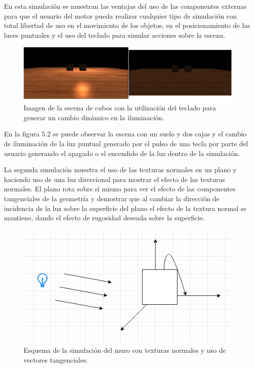 \documentclass[a4paper, 17pt]{book}
\begin{document}
En esta simulación se muestran las ventajas del uso de las componentes externas para que el usuario del motor pueda realizar
cualquier tipo de simulación con total libertad de uso en el movimiento de los objetos, en el posicionamiento de las luces
puntuales y el uso del teclado para simular acciones sobre la escena.

\begin{figure}[H]
    \centering
    \includegraphics[scale=0.45, keepaspectratio]{img/CubeEvents.png}
    \caption{Imagen de la escena de cubos con la utilización del teclado para generar un cambio dinámico en la iluminación.}
    \label{figura:CubeEvents}
\end{figure}

En la figura 5.2 se puede observar la escena con un suelo y dos cajas y el cambio de iluminación de la luz puntual generado por
el pulso de una tecla por parte del usuario generando el apagado o el encendido de la luz dentro de la simulación.

\vspace{1mm} %

La segunda simulación muestra el uso de las texturas normales en un plano y haciendo uso de una luz direccional para mostrar
el efecto de las texturas normales. El plano rota sobre sí mismo para ver el efecto de las componentes tangenciales de la
geometría y demostrar que al cambiar la dirección de incidencia de la luz sobre la superficie del plano el efecto de la textura
normal se mantiene, dando el efecto de rugosidad deseada sobre la superficie.

\begin{figure}[H]
    \centering
    \includegraphics[scale=0.50, keepaspectratio]{img/WallDiagram.png}
    \caption{Esquema de la simulación del muro con texturas normales y uso de vectores tangenciales.}
    \label{figura:WallDiagram}
\end{figure}
\end{document}
